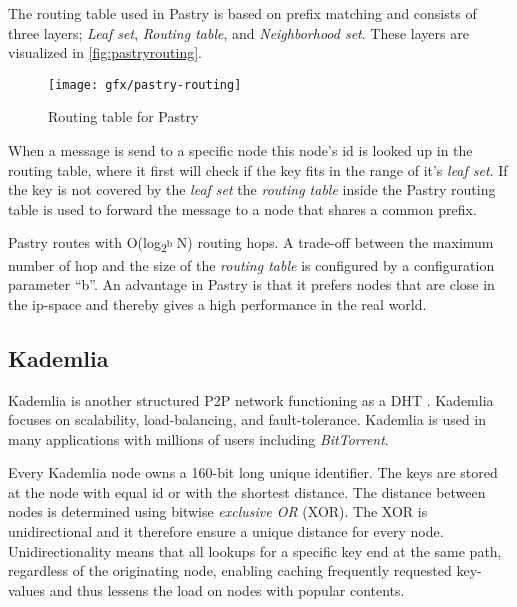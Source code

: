 The routing table used in Pastry is based on prefix matching and consists of three layers; \emph{Leaf set}, \emph{Routing table}, and \emph{Neighborhood set}. These layers are visualized in \autoref{fig:pastryrouting}.
\begin{figure}[bth]
\texttt{[image: gfx/pastry-routing]}
\caption[Routing table for Pastry]{Routing table for Pastry} \label{fig:pastryrouting}
\end{figure}

When a message is send to a specific node this node's id is looked up in the routing table, where it first will check if the key fits in the range of it's \emph{leaf set}. If the key is not covered by the \emph{leaf set} the \emph{routing table} inside the Pastry routing table is used to forward the message to a node that shares a common prefix. 

Pastry routes with O(log\textsubscript{2\textsuperscript b} N) routing hops. A trade-off between the maximum number of hop and the size of the \emph{routing table} is configured by a configuration parameter ``b''.
An advantage in Pastry is that it prefers nodes that are close in the ip-space and thereby gives a high performance in the real world.



\subsection{Kademlia}
Kademlia is another structured P2P network functioning as a DHT \cite{maymounkov2002kademlia}. Kademlia focuses on scalability, load-balancing, and fault-tolerance. Kademlia is used in many applications with millions of users including \emph{BitTorrent}.

Every Kademlia node owns a 160-bit long unique identifier. The keys are stored at the node with equal id or with the shortest distance.
The distance between nodes is determined using bitwise \emph{exclusive OR} (XOR). The XOR is unidirectional and it therefore ensure a unique distance for every node. Unidirectionality means that all lookups for a specific key end at the same path, regardless of the originating node, enabling caching frequently requested key-values and thus lessens the load on nodes with popular contents.

